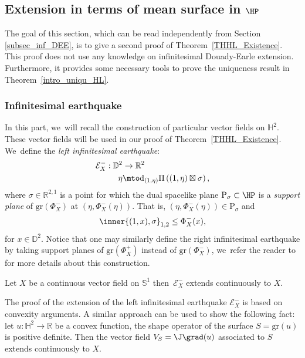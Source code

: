 \subsection{Extension in terms of mean surface in \texorpdfstring{$\HP$}{HP}}\label{section_5.2_extension_mean_surface}
The goal of this section, which can be read independently from Section \ref{subsec_inf_DEE}, is to give a second proof of Theorem~\ref{THHL_Existence}. This proof does not use any knowledge on infinitesimal Douady-Earle extension. Furthermore, it provides some necessary tools to prove the uniqueness result in Theorem~\ref{intro_uniqu_HL}.

\subsubsection{Infinitesimal earthquake}\label{appendix6.1}
In this part, we~will recall the construction of particular vector fields on $\mathbb{H}^2$. These vector fields will be used in our proof of Theorem~\ref{THHL_Existence}. We~define the \emph{left infinitesimal earthquake}:
\begin{equation}\label{infearth_convexhull}
\begin{aligned}
\mathcal{E}_{X}^-: \mathbb{D}^2 & \to \mathbb{R}^2 \\
\eta & \mto \mathrm{d}_{(1,\eta)}\Pi\left((1,\eta)\boxtimes \sigma\right),
\end{aligned}
\end{equation}
where $\sigma \in \mathbb{R}^{2,1}$ is a point for which the dual spacelike plane $\mathrm{P}_{\sigma}\subset\HP$ is a \emph{support plane} of $\mathrm{gr}(\Phi_X^-)$ at $(\eta, \Phi_X^-(\eta))$. That is, $(\eta, \Phi_X^-(\eta)) \in \mathrm{P}_{\sigma}$ and
\[
\inner{(1,x),\sigma}_{1,2}\leq\Phi_X^-(x),
\]
for $x\in\mathbb{D}^2$. Notice that one may similarly define the right infinitesimal earthquake by taking support planes of $\mathrm{gr}(\Phi_X^+)$ instead of $\mathrm{gr}(\Phi_X^-)$, we~refer the reader to \cite{diaf2023Infearth} for more details about this construction.

\begin{prop}\label{infinitesimal_earthquake_thm}
Let $X$ be a continuous vector field on $\mathbb{S}^1$ then~$\mathcal{E}_X^{-}$ extends continuously to $X$.
\end{prop}

\begin{remark}
The proof of the extension of the left infinitesimal earthquake $\mathcal{E}_X^-$ is based on convexity arguments. A similar approach can be used to show the following fact: let $u:\mathbb{H}^2\to\mathbb{R}$ be a convex function, \ie the shape operator of the surface $S=\mathrm{gr}(u)$ is positive definite. Then the vector field $V_S=\J\grad(u)$ associated to $S$ extends continuously to $X$.
\end{remark}
